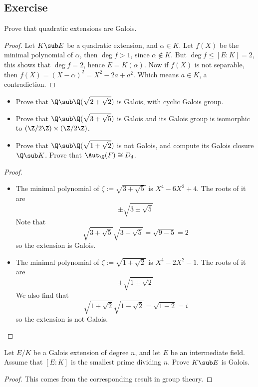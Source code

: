 \subsection{Exercise}
\begin{exercise}
Prove that quadratic extensions are Galois.
\end{exercise}
\begin{proof}
Let $K\sub E$ be a quadratic extension, and $\alpha\in K$. Let $f(X)$ be the minimal polynomial of $\alpha$, then $\deg f>1$, since $\alpha\notin K$. But $\deg f\leq[E:K]=2$, this shows that $\deg f=2$, hence $E=K(\alpha)$. Now if $f(X)$ is not separable, then $f(X)=(X-\alpha)^2=X^2-2a+a^2$. Which means $a\in K$, a contradiction.
\end{proof}
\begin{exercise}
\mbox{}
\begin{itemize}
\item Prove that $\Q\sub\Q(\sqrt{2+\sqrt{2}})$ is Galois, with cyclic Galois group.
\item Prove that $\Q\sub\Q(\sqrt{3+\sqrt{5}})$ is Galois and its Galois group is isomorphic to
$(\Z/2\Z)\times(\Z/2\Z)$.
\item Prove that $\Q\sub\Q(\sqrt{1+\sqrt{2}})$ is not Galois, and compute its Galois closure
$\Q\sub K$. Prove that $\Aut_\Q(F)\cong D_4$.
\end{itemize}
\end{exercise}
\begin{proof}
\mbox{}
\begin{itemize}
\item The minimal polynomial of $\zeta:=\sqrt{3+\sqrt{5}}$ is $X^4-6X^2+4$. The roots of it are
\[\pm\sqrt{3\pm\sqrt{5}}\]
Note that
\[\sqrt{3+\sqrt{5}}\sqrt{3-\sqrt{5}}=\sqrt{9-5}=2\]
so the extension is Galois.
\item The minimal polynomial of $\zeta:=\sqrt{1+\sqrt{2}}$ is $X^4-2X^2-1$. The roots of it are
\[\pm\sqrt{1\pm\sqrt{2}}\]
We also find that
\[\sqrt{1+\sqrt{2}}\sqrt{1-\sqrt{2}}=\sqrt{1-2}=i\]
so the extension is not Galois.
\end{itemize}
\end{proof}
\begin{exercise}
Let $E/K$ be a Galois extension of degree $n$, and let $E$ be an intermediate field. Assume that $[E:K]$ is the smallest prime dividing $n$. Prove $K\sub E$ is Galois.
\end{exercise}
\begin{proof}
This comes from the corresponding result in group theory.
\end{proof}
